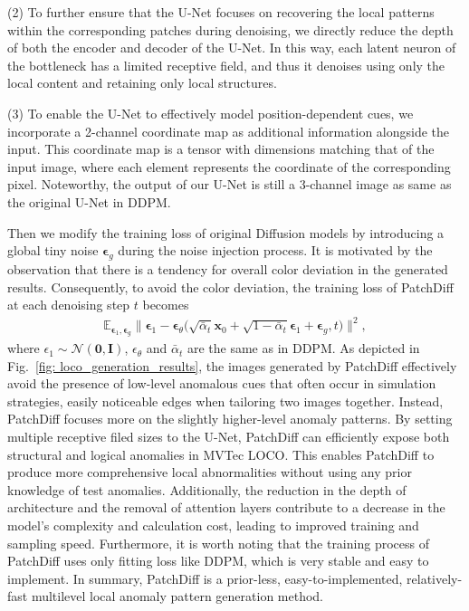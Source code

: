 \documentclass[letterpaper]{article} %
\newcommand{\bepsilon}{{\boldsymbol{\epsilon}}}
\begin{document}
(2) To further ensure that the U-Net focuses on recovering the local patterns within the corresponding patches during denoising, we directly reduce the depth of both the encoder and decoder of the U-Net. In this way, each latent neuron of the bottleneck has a limited receptive field, and thus it denoises using only the local content and retaining only local structures. %

(3) To enable the U-Net to effectively model position-dependent cues, we incorporate a 2-channel coordinate map as additional information alongside the input. This coordinate map is a tensor with dimensions matching that of the input image, where each element represents the coordinate of the corresponding pixel. Noteworthy, the output of our U-Net is still a 3-channel image as same as the original U-Net in DDPM.

Then we modify the training loss of original Diffusion models by introducing a global tiny noise $\bepsilon_{g}$ during the noise injection process. It is motivated by the observation that there is a tendency for overall color deviation in the generated results. Consequently, to avoid the color deviation, the training loss of PatchDiff at each denoising step $t$ becomes
\begin{equation*}
\begin{aligned}
\mathbb{E}_{\bepsilon_1, \bepsilon_g}
\big\| \bepsilon_1 - \bepsilon_\theta\bigl(\sqrt{\bar{\alpha}_t} \mathbf{x}_0 + \sqrt{1-\bar{\alpha}_t} \bepsilon_1 + \bepsilon_g, t\bigr) \big\|^2,
\end{aligned}
\end{equation*}
where $\epsilon_{1}\sim\mathcal{N}(\mathbf{0}, \mathbf{I})$, $\epsilon_{\theta}$ and $\bar{\alpha}_t$ are the same as in DDPM.
As depicted in Fig.~\ref{fig: loco_generation_results}, the images generated by PatchDiff effectively avoid the presence of low-level anomalous cues that often occur in simulation strategies, easily noticeable edges when tailoring two images together.
Instead, PatchDiff focuses more on the slightly higher-level anomaly patterns. By setting multiple receptive filed sizes to the U-Net, PatchDiff can efficiently expose both structural and logical anomalies in MVTec LOCO. This enables PatchDiff to produce more comprehensive local abnormalities without using any prior knowledge of test anomalies. Additionally, the reduction in the depth of architecture and the removal of attention layers contribute to a decrease in the model's complexity and calculation cost, leading to improved training and sampling speed. Furthermore, it is worth noting that the training process of PatchDiff uses only fitting loss like DDPM\cite{DDPM}, which is very stable and easy to implement. In summary, PatchDiff is a prior-less, easy-to-implemented, relatively-fast multilevel local anomaly pattern generation method.
\end{document}
